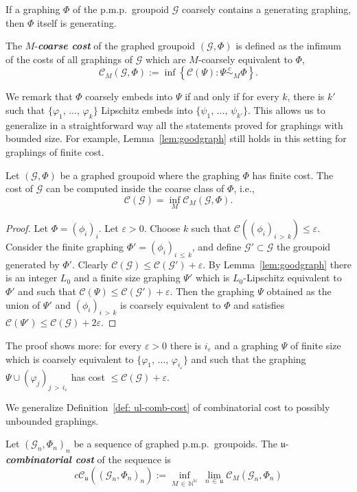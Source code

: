 \documentclass[AHL,Unicode,longabstracts,published]{cedram}
\newcommand{\defin}[1]{\textbf{\emph{#1}}}
\newcommand{\Nmath}{\mathbb{N}}
\newcommand{\cost}{\mathcal{C}}
\newcommand{\ccost}{c\mathcal{C}}
\newcommand{\cg}{\mathcal{G}}
\newcommand{\ul}{\mathfrak{u}}
\newcommand{\eps}{\varepsilon}
\newcommand{\ph}{\varphi}
\newcommand{\pmp}{p.m.p.\ }
\newcommand\ceq{\overset{c}{\sim}}
\begin{document}
If a graphing $\Phi$ of the \pmp groupoid $\cg$ coarsely contains a generating graphing, then $\Phi$ itself is generating.

The $M$-\defin{coarse cost} of the graphed groupoid $(\cg,\Phi)$ is defined as the infimum of the costs of all graphings of $\cg$ which are $M$-coarsely equivalent to $\Phi$,
\[
\cost_M(\cg,\Phi):=\inf\left\{\cost(\Psi)\colon \Psi\ceq_M\Phi \right\}.
\]

We remark that $\Phi$ coarsely embeds into $\Psi$ if and only if for every $k$, there is $k'$ such that $\{\ph_1,\,\dots,\,\ph_k\}$ Lipschitz embeds into $\{\psi_1,\,\dots,\,\psi_{k'}\}$. This allows us to generalize in a straightforward way all the statements proved for graphings with bounded size. For example, Lemma~\ref{lem:goodgraph} still holds in this setting for graphings of finite cost.

\begin{lemm}\label{lem:goodgraphcoarse}
Let $(\cg,\Phi)$ be a graphed groupoid where the graphing $\Phi$ has finite cost. The cost of $\cg$ can be computed inside the coarse class of $\Phi$, i.e.,
\begin{equation}
\cost(\cg)=\inf_M\cost_M(\cg,\Phi).
\end{equation}
\end{lemm}
\begin{proof}
Let $\Phi=(\phi_i)_i$. Let $\eps>0$. Choose $k$ such that $\cost((\phi_i)_{i\,>\,k}) \leq \eps$. Consider the finite graphing $\Phi'=(\phi_i)_{i\,\leq\,k}$, and define $\cg' \subset \cg$ the groupoid generated by $\Phi'$. Clearly $\cost(\cg) \leq \cost(\cg')+\eps$. By Lemma~\ref{lem:goodgraph} there is an integer $L_0$ and a finite size graphing $\Psi'$ which is $L_0$-Lipschitz equivalent to $\Phi'$ and such that $\cost(\Psi) \leq \cost(\cg')+\varepsilon$. Then the graphing $\Psi$ obtained as the union of $\Psi'$ and $(\phi_i)_{i\,>\,k}$ is coarsely equivalent to $\Phi$ and satisfies $\cost(\Psi') \leq \cost(\cg)+2\varepsilon$.
\end{proof}

\begin{rema}\label{rem:goodgraphcoarse}
The proof shows more: for every $\varepsilon>0$ there is $i_\varepsilon$ and a graphing $\Psi$ of finite size which is coarsely equivalent to $\{\ph_1,\,\dots,\,\ph_{i_\varepsilon}\}$ and such that the graphing $\Psi \cup (\ph_j)_{j\,>\,i_\varepsilon}$ has cost $\leq \cost(\cg)+\varepsilon$.
\end{rema}

We generalize Definition~\ref{def: ul-comb-cost} of combinatorial cost to possibly unbounded graphings.
\begin{defi}\label{def: comb cost, infinite size}
Let $(\cg_n,\Phi_n)_n$ be a sequence of graphed \pmp groupoids. The $\ul$-
\defin{combinatorial cost} of the sequence is
\begin{equation}
\ccost_\ul((\cg_n,\Phi_n)_n):=\inf_{M\,\in\,\Nmath^\Nmath}\;\lim_{n\,\in\,\ul}\cost_M(\cg_n,\Phi_n)
\end{equation}
\end{defi}
\end{document}
